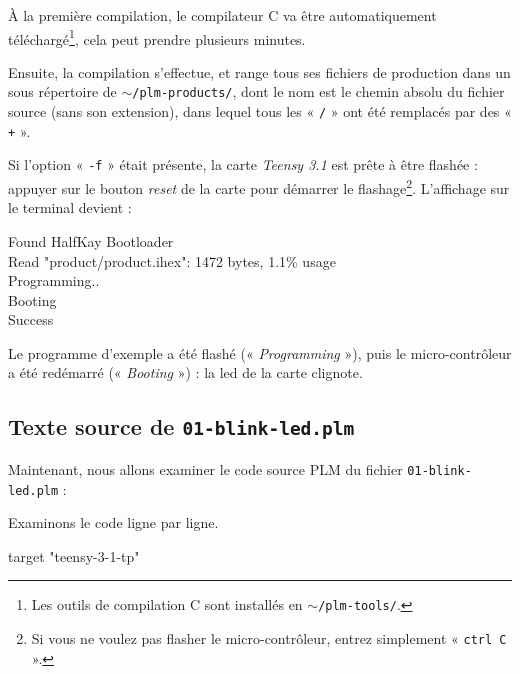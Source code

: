 À la première compilation, le compilateur C va être automatiquement téléchargé\footnote{Les outils de compilation C sont installés en \texttt{$\sim$/plm-tools/}.}, cela peut prendre plusieurs minutes.

Ensuite, la compilation s'effectue, et range tous ses fichiers de production dans un sous répertoire de \texttt{$\sim$/plm-products/}, dont le nom est le  chemin absolu du fichier source (sans son extension), dans lequel tous les « \texttt{/} » ont été remplacés par des « \texttt{+} ».

Si l'option « \texttt{-f} » était présente, la carte \emph{Teensy 3.1} est prête à être flashée : appuyer sur le bouton \emph{reset} de la carte pour démarrer le flashage\footnote{Si vous ne voulez pas flasher le micro-contrôleur, entrez simplement « \texttt{ctrl~C} ».}. L'affichage sur le terminal devient :
\begin{SHELL}
Found HalfKay Bootloader\\
Read "product/product.ihex": 1472 bytes, 1.1\% usage\\
Programming..\\
Booting\\
Success
\end{SHELL}

Le programme d'exemple a été flashé (« \emph{Programming} »), puis le micro-contrôleur a été redémarré (« \emph{Booting} ») : la led de la carte clignote.

\subsection{Texte source de \texttt{01-blink-led.plm}}

Maintenant, nous allons examiner le code source PLM du fichier \texttt{01-blink-led.plm} :


Examinons le code ligne par ligne.

\begin{PLM}[1]
target "teensy-3-1-tp"
\end{PLM}

